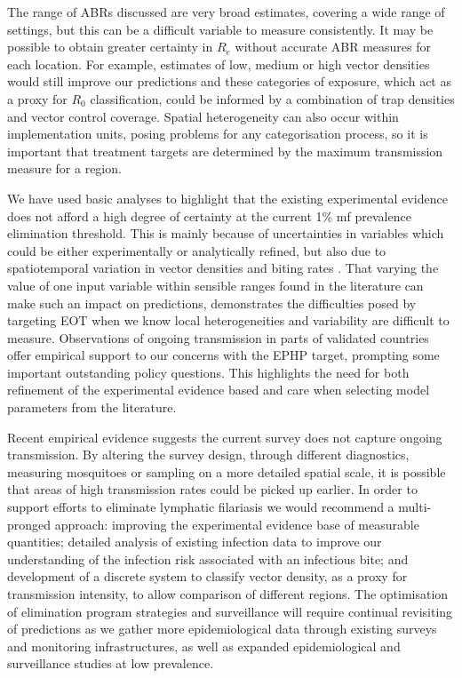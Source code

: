 The range of ABRs discussed are very broad estimates, covering a wide range of settings, but this can be a difficult variable to measure consistently. It may be possible to obtain greater certainty in $R_e$ without accurate ABR measures for each location. For example, estimates of low, medium or high vector densities would still improve our predictions and these categories of exposure, which act as a proxy for $R_0$ classification, could be informed by a combination of trap densities and vector control coverage. Spatial heterogeneity can also occur within implementation units, posing problems for any categorisation process, so it is important that treatment targets are determined by the maximum transmission measure for a region. 

We have used basic analyses to highlight that the existing experimental evidence does not afford a high degree of certainty at the current 1\% mf prevalence elimination threshold. This is mainly because of uncertainties in variables which could be either experimentally or analytically refined, but also due to spatiotemporal variation in vector densities and biting rates \cite{Michael2016}. That varying the value of one input variable within sensible ranges found in the literature can make such an impact on predictions, demonstrates the difficulties posed by targeting EOT when we know local heterogeneities and variability are difficult to measure. Observations of ongoing transmission in parts of validated countries offer empirical support to our concerns with the EPHP target, prompting some important outstanding policy questions. This highlights the need for both refinement of the experimental evidence based and care when selecting model parameters from the literature.

Recent empirical evidence suggests the current survey does not capture ongoing transmission. By altering the survey design, through different diagnostics, measuring mosquitoes or sampling on a more detailed spatial scale, it is possible that areas of high transmission rates could be picked up earlier. In order to support efforts to eliminate lymphatic filariasis we would recommend a multi-pronged approach: improving the experimental evidence base of measurable quantities; detailed analysis of existing infection data to improve our understanding of the infection risk associated with an infectious bite; and development of a discrete system to classify vector density, as a proxy for transmission intensity, to allow comparison of different regions. The optimisation of elimination program strategies and surveillance will require continual revisiting of predictions as we gather more epidemiological data through existing surveys and monitoring infrastructures, as well as expanded epidemiological and surveillance studies at low prevalence. 

